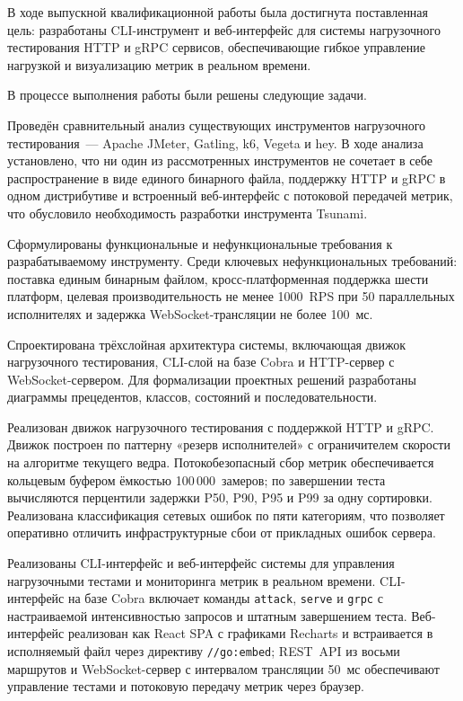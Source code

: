 В ходе выпускной квалификационной работы была достигнута поставленная цель:
разработаны CLI-инструмент и веб-интерфейс для системы нагрузочного тестирования
HTTP и gRPC сервисов, обеспечивающие гибкое управление нагрузкой
и визуализацию метрик в реальном времени.

В процессе выполнения работы были решены следующие задачи.

Проведён сравнительный анализ существующих инструментов нагрузочного
тестирования~--- Apache JMeter, Gatling, k6, Vegeta и hey.
В ходе анализа установлено, что ни один из рассмотренных инструментов
не сочетает в себе распространение в виде единого бинарного файла, поддержку HTTP и gRPC
в одном дистрибутиве и встроенный веб-интерфейс с потоковой передачей метрик,
что обусловило необходимость разработки инструмента Tsunami.

Сформулированы функциональные и нефункциональные
требования к разрабатываемому инструменту.
Среди ключевых нефункциональных требований: поставка единым бинарным файлом,
кросс-платформенная поддержка шести платформ, целевая производительность
не менее 1000~RPS при 50 параллельных исполнителях и задержка WebSocket-трансляции
не более 100~мс.

Спроектирована трёхслойная архитектура системы, включающая движок нагрузочного
тестирования, CLI-слой на базе Cobra и HTTP-сервер с WebSocket-сервером.
Для формализации проектных решений разработаны диаграммы прецедентов, классов,
состояний и последовательности.

Реализован движок нагрузочного тестирования с поддержкой HTTP и gRPC.
Движок построен по паттерну «резерв исполнителей» с ограничителем скорости
на алгоритме текущего ведра.
Потокобезопасный сбор метрик обеспечивается кольцевым буфером ёмкостью
100\,000~замеров; по завершении теста вычисляются перцентили задержки
P50, P90, P95 и P99 за одну сортировки.
Реализована классификация сетевых ошибок по пяти категориям,
что позволяет оперативно отличить инфраструктурные сбои от прикладных ошибок сервера.

Реализованы CLI-интерфейс и веб-интерфейс системы для управления нагрузочными
тестами и мониторинга метрик в реальном времени.
CLI-интерфейс на базе Cobra включает команды \texttt{attack}, \texttt{serve}
и \texttt{grpc} с настраиваемой интенсивностью запросов и штатным завершением теста.
Веб-интерфейс реализован как React SPA с графиками Recharts и встраивается
в исполняемый файл через директиву \texttt{//go:embed};
REST~API из восьми маршрутов и WebSocket-сервер с интервалом трансляции 50~мс
обеспечивают управление тестами и потоковую передачу метрик через браузер.

